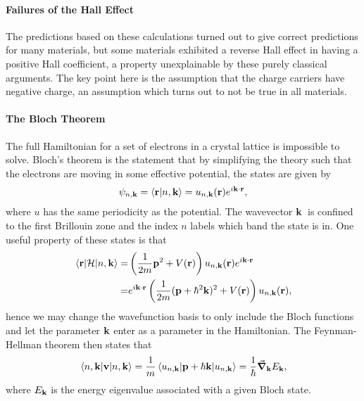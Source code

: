 \paragraph{Failures of the Hall Effect}
The predictions based on these calculations turned out to give correct predictions for many materials, but some materials exhibited a reverse Hall effect in having a positive Hall coefficient, a property unexplainable by these purely classical arguments. The key point here is the assumption that the charge carriers have negative charge, an assumption which turns out to not be true in all materials.

\paragraph{The Bloch Theorem}
The full Hamiltonian for a set of electrons in a crystal lattice is impossible to solve. Bloch's theorem is the statement that by simplifying the theory such that the electrons are moving in some effective potential, the states are given by
\begin{align*}
	\psi_{n, \vb{k}} = \braket{\vb{r}}{n, \vb{k}} = u_{n, \vb{k}}(\vb{r})e^{i\vb{k}\cdot\vb{r}},
\end{align*}
where $u$ has the same periodicity as the potential. The wavevector $\vb{k}$ is confined to the first Brillouin zone and the index $n$ labels which band the state is in. One useful property of these states is that
\begin{align*}
	\mel{\vb{r}}{\ensuremath{\mathcal{H}}}{n, \vb{k}} =& \left(\frac{1}{2m}\vb{p}^{2} + V(\vb{r})\right)u_{n, \vb{k}}(\vb{r})e^{i\vb{k}\cdot\vb{r}} \\
	=& e^{i\vb{k}\cdot\vb{r}}\left(\frac{1}{2m}(\vb{p} + \hbar^{2}\vb{k})^{2} + V(\vb{r})\right)u_{n, \vb{k}}(\vb{r}),
\end{align*}
hence we may change the wavefunction basis to only include the Bloch functions and let the parameter $\vb{k}$ enter as a parameter in the Hamiltonian. The Feynman-Hellman theorem then states that
\begin{align*}
	\expval{\vb{v}}{n, \vb{k}} = \frac{1}{m}\expval{\vb{p} + \hbar\vb{k}}{u_{n, \vb{k}}} = \frac{1}{\hbar}\grad_{\vb{k}}E_{\vb{k}},
\end{align*}
where $E_{\vb{k}}$ is the energy eigenvalue associated with a given Bloch state.

